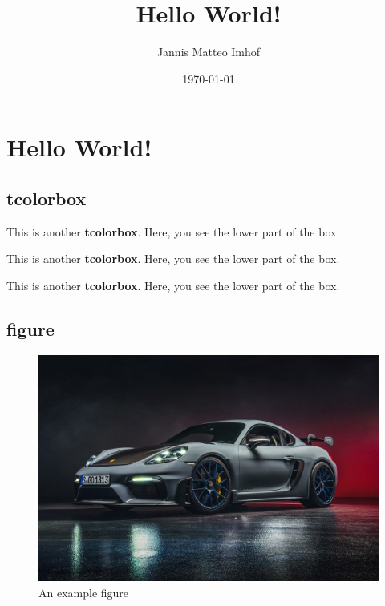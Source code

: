 \documentclass{scrreprt}
\title{Hello World!}
\date{\today}
\author{Jannis Matteo Imhof}
\begin{document}
\maketitle

\tableofcontents

\chapter{Hello World!}

\section{tcolorbox}
\begin{tcolorbox}[colback=red!5!white,colframe=red!75!black,title=My nice heading]
    This is another \textbf{tcolorbox}.
    \tcblower
    Here, you see the lower part of the box.
\end{tcolorbox}

\begin{tcolorbox}[colback=black!25!white,colframe=black!75!white,title=My nice heading]
    This is another \textbf{tcolorbox}.
    \tcblower
    Here, you see the lower part of the box.
\end{tcolorbox}

\begin{tcolorbox}
    This is another \textbf{tcolorbox}.
    \tcblower
    Here, you see the lower part of the box.
\end{tcolorbox}

\section{figure}
\begin{figure}[!h]
    \centering
    \includegraphics[width=\linewidth]{porsche_911_gt4_rs.jpg}
    \caption{An example figure}
    \label{fgr:porsche}
\end{figure}
\end{document}
